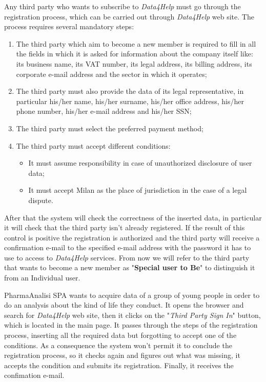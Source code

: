 Any third party who wants to subscribe to \textit{Data4Help} must go through the registration process, which can be carried out through \textit{Data4Help} web site. The process requires several mandatory steps:
\begin{enumerate}
  \item The third party which aim to become a new member is required to fill in all the fields in which it is asked for information about the company itself like: its business name, its VAT number, its legal address, its billing address, its corporate e-mail address and the sector in which it operates;
  \item The third party must also provide the data of its legal representative, in particular his/her name, his/her surname, his/her office address, his/her phone number, his/her e-mail address and his/her SSN;
  \item The third party must select the preferred payment method;
  \item The third party must accept different conditions:
    \begin{itemize}
      \item It must assume responsibility in case of unauthorized disclosure of user data;
      \item It must accept Milan as the place of jurisdiction in the case of a legal dispute.
    \end{itemize}
\end{enumerate}
After that the system will check the correctness of the inserted data, in particular it will check that the third party isn't already registered. If the result of this control is positive the registration is authorized and the third party will receive a confirmation e-mail to the specified e-mail address with the password it has to use to access to \textit{Data4Help} services.
From now we will refer to the third party that wants to become a new member as "\textbf{Special user to Be}" to distinguish it from an Individual user.

PharmaAnalisi SPA wants to acquire data of a group of young people in order to do an analysis about the kind of life they conduct. It opens the browser and search for \textit{Data4Help} web site, then it clicks on the "\textit{Third Party Sign In}" button, which is located in the main page. It passes through the steps of the registration process, inserting all the required data but forgotting to accept one of the conditions. As a consequence the system won't permit it to conclude the registration process, so it checks again and figures out what was missing, it accepts the condition and submits its registration. Finally, it receives the confimation e-mail.

